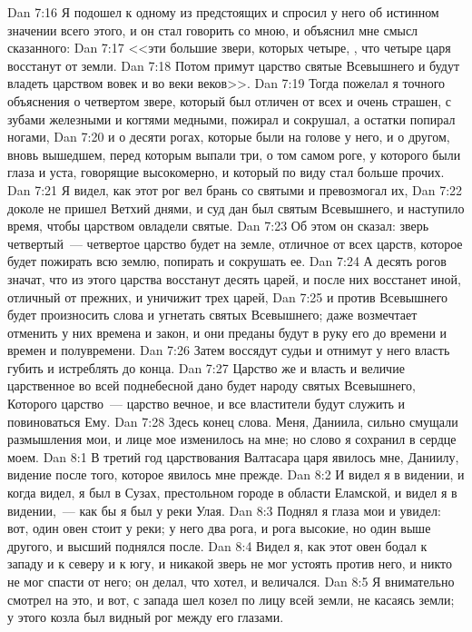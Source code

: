 \vs Dan 7:16 Я подошел к одному из предстоящих и спросил у него об истинном значении всего этого, и он стал говорить со мною, и объяснил мне смысл сказанного:
\vs Dan 7:17 <<эти большие звери, которых четыре, , что четыре царя восстанут от земли.
\vs Dan 7:18 Потом примут царство святые Всевышнего и будут владеть царством вовек и во веки веков>>.
\vs Dan 7:19 Тогда пожелал я точного объяснения о четвертом звере, который был отличен от всех и очень страшен, с зубами железными и когтями медными, пожирал и сокрушал, а остатки попирал ногами,
\vs Dan 7:20 и о десяти рогах, которые были на голове у него, и о другом, вновь вышедшем, перед которым выпали три, о том самом роге, у которого были глаза и уста, говорящие высокомерно, и который по виду стал больше прочих.
\vs Dan 7:21 Я видел, как этот рог вел брань со святыми и превозмогал их,
\vs Dan 7:22 доколе не пришел Ветхий днями, и суд дан был святым Всевышнего, и наступило время, чтобы царством овладели святые.
\vs Dan 7:23 Об этом он сказал: зверь четвертый~--- четвертое царство будет на земле, отличное от всех царств, которое будет пожирать всю землю, попирать и сокрушать ее.
\vs Dan 7:24 А десять рогов значат, что из этого царства восстанут десять царей, и после них восстанет иной, отличный от прежних, и уничижит трех царей,
\vs Dan 7:25 и против Всевышнего будет произносить слова и угнетать святых Всевышнего; даже возмечтает отменить у них  времена и закон, и они преданы будут в руку его до времени и времен и полувремени.
\vs Dan 7:26 Затем воссядут судьи и отнимут у него власть губить и истреблять до конца.
\vs Dan 7:27 Царство же и власть и величие царственное во всей поднебесной дано будет народу святых Всевышнего, Которого царство~--- царство вечное, и все властители будут служить и повиноваться Ему.
\vs Dan 7:28 Здесь конец слова. Меня, Даниила, сильно смущали размышления мои, и лице мое изменилось на мне; но слово я сохранил в сердце моем.
\vs Dan 8:1 В третий год царствования Валтасара царя явилось мне, Даниилу, видение после того, которое явилось мне прежде.
\vs Dan 8:2 И видел я в видении, и когда видел, я был в Сузах, престольном городе в области Еламской, и видел я в видении,~--- как бы я был у реки Улая.
\vs Dan 8:3 Поднял я глаза мои и увидел: вот, один овен стоит у реки; у него два рога, и рога высокие, но один выше другого, и высший поднялся после.
\vs Dan 8:4 Видел я, как этот овен бодал к западу и к северу и к югу, и никакой зверь не мог устоять против него, и никто не мог спасти от него; он делал, что хотел, и величался.
\vs Dan 8:5 Я внимательно смотрел на это, и вот, с запада шел козел по лицу всей земли, не касаясь земли; у этого козла был видный рог между его глазами.
